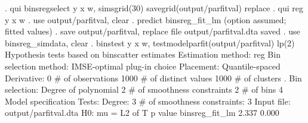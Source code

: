 . qui binsregselect y x w, simsgrid(30) savegrid(output/parfitval) replace
{\smallskip}
. qui reg y x w
{\smallskip}
. use output/parfitval, clear
{\smallskip}
. predict binsreg_fit_lm
(option {} assumed; fitted values)
{\smallskip}
. save output/parfitval, replace
file output/parfitval.dta saved
{\smallskip}
. use binsreg_simdata, clear
{\smallskip}
. binstest y x w, testmodelparfit(output/parfitval) lp(2)
{\smallskip}
Hypothesis tests based on binscatter estimates
Estimation method: reg
Bin selection method: IMSE-optimal plug-in choice
Placement: Quantile-spaced
Derivative: 0
{\smallskip}
\# of observations             {\VBAR}    1000
\# of distinct values          {\VBAR}    1000
\# of clusters                 {\VBAR}       .
Bin selection:                {\VBAR} 
         Degree of polynomial {\VBAR}       2
  \# of smoothness constraints {\VBAR}       2
                    \# of bins {\VBAR}       4
{\smallskip}
Model specification Tests:
Degree: 3     \# of smoothness constraints: 3
{\smallskip}
Input file: output/parfitval.dta
H0: mu =           {\VBAR} L2 of T           p value
   binsreg_fit_lm  {\VBAR}   2.337             0.000
